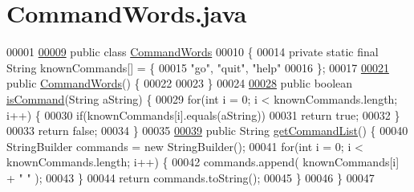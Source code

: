 \hypertarget{CommandWords_8java_source}{\section{Command\-Words.\-java}
}

\begin{DoxyCode}
00001 
\hypertarget{CommandWords_8java_source_l00009}{}\hyperlink{classCommandWords}{00009} \textcolor{keyword}{public} \textcolor{keyword}{class }\hyperlink{classCommandWords}{CommandWords}
00010 \{
00014     \textcolor{keyword}{private} \textcolor{keyword}{static} \textcolor{keyword}{final} String knownCommands[] = \{
00015         \textcolor{stringliteral}{"go"}, \textcolor{stringliteral}{"quit"}, \textcolor{stringliteral}{"help"}
00016     \};
00017 
\hypertarget{CommandWords_8java_source_l00021}{}\hyperlink{classCommandWords_a2d8c096723adb3f822cc001bccd92ed7}{00021}     \textcolor{keyword}{public} \hyperlink{classCommandWords_a2d8c096723adb3f822cc001bccd92ed7}{CommandWords}() \{
00022 
00023     \}
00024 
\hypertarget{CommandWords_8java_source_l00028}{}\hyperlink{classCommandWords_a98619d278b3fa23fed18b5834f9d20a8}{00028}     \textcolor{keyword}{public} \textcolor{keywordtype}{boolean} \hyperlink{classCommandWords_a98619d278b3fa23fed18b5834f9d20a8}{isCommand}(String aString) \{
00029         \textcolor{keywordflow}{for}(\textcolor{keywordtype}{int} i = 0; i < knownCommands.length; i++) \{
00030             \textcolor{keywordflow}{if}(knownCommands[i].equals(aString))
00031                 \textcolor{keywordflow}{return} \textcolor{keyword}{true};
00032         \}
00033         \textcolor{keywordflow}{return} \textcolor{keyword}{false};
00034     \}
00035 
\hypertarget{CommandWords_8java_source_l00039}{}\hyperlink{classCommandWords_aa26f54985e39543739e0ae291dcdb8f1}{00039}     \textcolor{keyword}{public} String \hyperlink{classCommandWords_aa26f54985e39543739e0ae291dcdb8f1}{getCommandList}() \{
00040         StringBuilder commands = \textcolor{keyword}{new} StringBuilder();
00041         \textcolor{keywordflow}{for}(\textcolor{keywordtype}{int} i = 0; i < knownCommands.length; i++) \{
00042             commands.append( knownCommands[i] + \textcolor{stringliteral}{"  "} );
00043         \}
00044         \textcolor{keywordflow}{return} commands.toString();
00045     \}
00046 \}
00047 
\end{DoxyCode}
